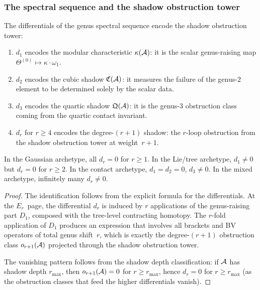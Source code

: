 \subsubsection{The spectral sequence and the shadow obstruction tower}
\label{subsubsec:thqg-VII-ss-shadow}

\begin{theorem}
\label{thm:thqg-VII-ss-shadow-obstruction}
The differentials of the genus spectral sequence encode the
shadow obstruction tower:
\begin{enumerate}[label=\textup{(\roman*)}]
\item $d_1$ encodes the modular characteristic $\kappa(\mathcal{A})$:
 it is the scalar genus-raising map
 $\Theta^{(0)} \mapsto \kappa \cdot \omega_1$.
\item $d_2$ encodes the cubic shadow $\mathfrak{C}(\mathcal{A})$:
 it measures the failure of the genus-$2$ element to be
 determined solely by the scalar data.
\item $d_3$ encodes the quartic shadow $\mathfrak{Q}(\mathcal{A})$:
 it is the genus-$3$ obstruction class coming from the
 quartic contact invariant.
\item $d_r$ for $r \geq 4$ encodes the degree-$(r{+}1)$
 shadow: the $r$-loop obstruction from the shadow
 obstruction tower at weight~$r+1$.
\end{enumerate}
In the Gaussian archetype, all $d_r = 0$ for $r \geq 1$.
In the Lie/tree archetype, $d_1 \neq 0$ but $d_r = 0$ for
$r \geq 2$. In the contact archetype, $d_1 = d_2 = 0$,
$d_3 \neq 0$. In the mixed archetype, infinitely many
$d_r \neq 0$.
\end{theorem}

\begin{proof}
The identification follows from the explicit formula for the
differentials. At the $E_r$~page, the differential $d_r$
is induced by $r$ applications of the genus-raising part $D_1$,
composed with the tree-level contracting homotopy. The
$r$-fold application of $D_1$ produces an expression that
involves all brackets and BV operators of total genus shift~$r$,
which is exactly the degree-$(r{+}1)$ obstruction class
$o_{r+1}(\mathcal{A})$ projected through the shadow obstruction tower.

The vanishing pattern follows from the shadow depth
classification: if $\mathcal{A}$ has shadow depth $r_{\max}$, then
$o_{r+1}(\mathcal{A}) = 0$ for $r \geq r_{\max}$, hence $d_r = 0$
for $r \geq r_{\max}$ (as the obstruction classes that feed
the higher differentials vanish).
\end{proof}

